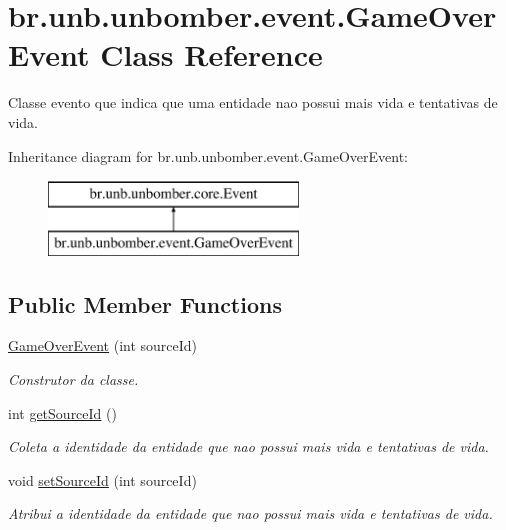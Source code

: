 \hypertarget{classbr_1_1unb_1_1unbomber_1_1event_1_1_game_over_event}{\section{br.\+unb.\+unbomber.\+event.\+Game\+Over\+Event Class Reference}
\label{classbr_1_1unb_1_1unbomber_1_1event_1_1_game_over_event}
}


Classe evento que indica que uma entidade nao possui mais vida e tentativas de vida.  


Inheritance diagram for br.\+unb.\+unbomber.\+event.\+Game\+Over\+Event\+:\begin{figure}[H]
\begin{center}
\leavevmode
\includegraphics[height=2.000000cm]{classbr_1_1unb_1_1unbomber_1_1event_1_1_game_over_event}
\end{center}
\end{figure}
\subsection*{Public Member Functions}
\begin{DoxyCompactItemize}
\item 
\hyperlink{classbr_1_1unb_1_1unbomber_1_1event_1_1_game_over_event_aec54ddeccb3cea5d6971708586248e5a}{Game\+Over\+Event} (int source\+Id)
\begin{DoxyCompactList}\small\item\em Construtor da classe. \end{DoxyCompactList}\item 
int \hyperlink{classbr_1_1unb_1_1unbomber_1_1event_1_1_game_over_event_a312333f86e4e7f5e21a95e53d08688fd}{get\+Source\+Id} ()
\begin{DoxyCompactList}\small\item\em Coleta a identidade da entidade que nao possui mais vida e tentativas de vida. \end{DoxyCompactList}\item 
void \hyperlink{classbr_1_1unb_1_1unbomber_1_1event_1_1_game_over_event_ac4b79a9db3bc279946abda3853dd5f73}{set\+Source\+Id} (int source\+Id)
\begin{DoxyCompactList}\small\item\em Atribui a identidade da entidade que nao possui mais vida e tentativas de vida. \end{DoxyCompactList}\end{DoxyCompactItemize}


